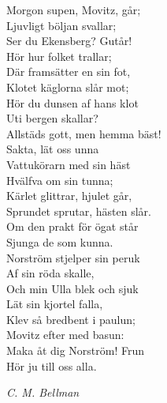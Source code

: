 \documentclass[a6paper,10pt]{article}
\newcommand{\notis}[1]{\begin{flushright}\textit{#1}\end{flushright}}
\begin{document}
\newpage
\setlength{\oddsidemargin}{-0.47in}
\noindent
Morgon supen, Movitz, går;\\
Ljuvligt böljan svallar;\\
Ser du Ekensberg? Gutår!\\
Hör hur folket trallar;\\
Där framsätter en sin fot,\\
Klotet käglorna slår mot;\\
Hör du dunsen af hans klot\\
Uti bergen skallar?
\vspace{5pt}\\
Allstäds gott, men hemma bäst!\\
Sakta, lät oss unna\\
Vattukörarn med sin häst\\
Hvälfva om sin tunna;\\
Kärlet glittrar, hjulet går,\\
Sprundet sprutar, hästen slår.\\
Om den prakt för ögat står\\
Sjunga de som kunna.
\vspace{5pt}\\
Norström stjelper sin peruk\\
Af sin röda skalle,\\
Och min Ulla blek och sjuk\\
Lät sin kjortel falla,\\
Klev så bredbent i paulun;\\
Movitz efter med basun:\\
Maka åt dig Norström! Frun\\
Hör ju till oss alla.
\notis{C. M. Bellman}
\end{document}
